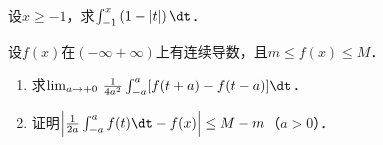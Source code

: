 \documentclass[plain,noanswer,medmath]{../../template/jnuexam}
\begin{document}




\begin{problem}
设$x\ge -1$，求$\int_{-1}^x \left(1-|t| \right)\dt$．
\end{problem}



\begin{problem}
设$f(x)$在$(-\infty +\infty)$上有连续导数，且$m\le f(x)\le M$．
\begin{enumerate}
\item 求$\lim_{a\to +0}\,\frac{1}{4a^2}\int_{-a}^a [f(t+a)-f(t-a)]\dt$．
\item 证明$\left| \frac{1}{2a}\int_{-a}^a f(t)\dt-f(x) \right|\le M-m$（$a>0$）．
\end{enumerate}
\end{problem}
\end{document}

